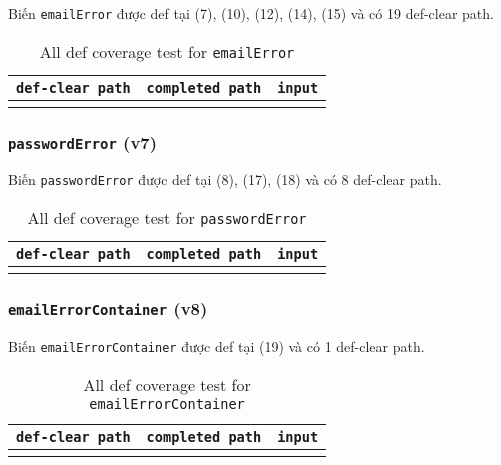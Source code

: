 \documentclass{article}
\begin{document}
\par Biến \texttt{emailError} được def tại (7), (10), (12), (14), (15) và có 19 def-clear path.

\FloatBarrier
\begin{table}[htp]
    \centering
    \begin{tabular}{c|c|c}
        \texttt{def-clear path} & \texttt{completed path} & \texttt{input} \\
        \toprule
        \bottomrule
         &  &
    \end{tabular}
    \caption{All def coverage test for \texttt{emailError}}
\end{table}
\FloatBarrier

\subsubsection*{\texttt{passwordError} (v7)}

\par Biến \texttt{passwordError} được def tại (8), (17), (18) và có 8 def-clear path.

\FloatBarrier
\begin{table}[htp]
    \centering
    \begin{tabular}{c|c|c}
        \texttt{def-clear path} & \texttt{completed path} & \texttt{input} \\
        \toprule
        \bottomrule
         &  &
    \end{tabular}
    \caption{All def coverage test for \texttt{passwordError}}
\end{table}
\FloatBarrier

\subsubsection*{\texttt{emailErrorContainer} (v8)}

\par Biến \texttt{emailErrorContainer} được def tại (19) và có 1 def-clear path.

\FloatBarrier
\begin{table}[htp]
    \centering
    \begin{tabular}{c|c|c}
        \texttt{def-clear path} & \texttt{completed path} & \texttt{input} \\
        \toprule
        \bottomrule
         &  &
    \end{tabular}
    \caption{All def coverage test for \texttt{emailErrorContainer}}
\end{table}
\FloatBarrier
\end{document}
